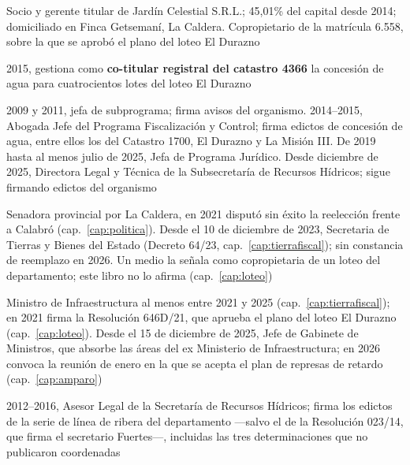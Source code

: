 \begin{personas}
\item[{\textbf{Héctor D'Andrea\index{D'Andrea, Héctor}}}] Socio y gerente titular de Jardín Celestial S.R.L.; 45,01\% del capital desde 2014; domiciliado en Finca Getsemaní, La Caldera. Copropietario de la matrícula 6.558, sobre la que se aprobó el plano del loteo El Durazno

\item[{\textbf{Magdalena Vidal\index{Vidal, Magdalena}}}] 2015, gestiona como \textbf{co-titular registral del catastro 4366} la concesión de agua para cuatrocientos lotes del loteo El Durazno

\item[{\textbf{Silvia F.\ Santamaría\index{Santamaría, Silvia F.}}}] 2009 y 2011, jefa de subprograma; firma avisos del organismo. 2014--2015, Abogada Jefe del Programa Fiscalización y Control; firma edictos de concesión de agua, entre ellos los del Catastro 1700, El Durazno y La Misión III. De 2019 hasta al menos julio de 2025, Jefa de Programa Jurídico. Desde diciembre de 2025, Directora Legal y Técnica de la Subsecretaría de Recursos Hídricos; sigue firmando edictos del organismo

\item[{\textbf{María Silvina Abilés\index{Abilés, María Silvina}}}] Senadora provincial por La Caldera, en 2021 disputó sin éxito la reelección frente a Calabró (cap.\ \ref{cap:politica}). Desde el 10 de diciembre de 2023, Secretaria de Tierras y Bienes del Estado (Decreto 64/23, cap.\ \ref{cap:tierrafiscal}); sin constancia de reemplazo en 2026. Un medio la señala como copropietaria de un loteo del departamento; este libro no lo afirma (cap.\ \ref{cap:loteo})

\item[{\textbf{Sergio Camacho\index{Camacho, Sergio}}}] Ministro de Infraestructura al menos entre 2021 y 2025 (cap.\ \ref{cap:tierrafiscal}); en 2021 firma la Resolución 646D/21, que aprueba el plano del loteo El Durazno (cap.\ \ref{cap:loteo}). Desde el 15 de diciembre de 2025, Jefe de Gabinete de Ministros, que absorbe las áreas del ex Ministerio de Infraestructura; en 2026 convoca la reunión de enero en la que se acepta el plan de represas de retardo (cap.\ \ref{cap:amparo})

\item[{\textbf{Matías J.\ Brogin\index{Brogin, Matías J.}}}] 2012--2016, Asesor Legal de la Secretaría de Recursos Hídricos; firma los edictos de la serie de línea de ribera del departamento ---salvo el de la Resolución 023/14, que firma el secretario Fuertes---, incluidas las tres determinaciones que no publicaron coordenadas


\end{personas}
